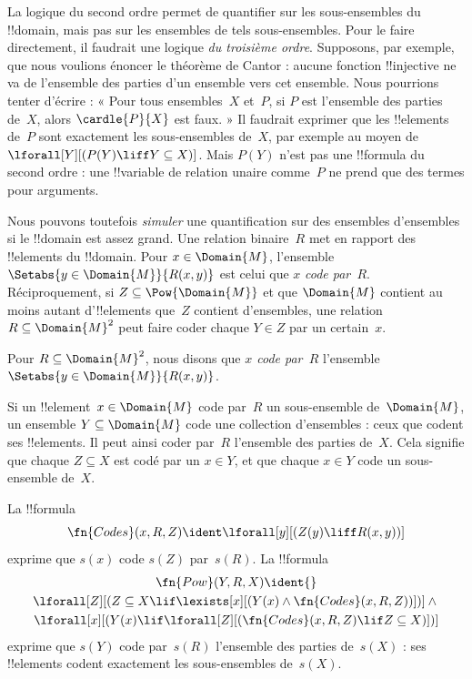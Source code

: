 \documentclass[../../../include/open-logic-section]{subfiles}
\begin{document}


\begin{explain}
La logique du second ordre permet de quantifier
sur les sous-ensembles du !!{domain}, mais pas
sur les ensembles de tels sous-ensembles. Pour
le faire directement, il faudrait une logique
\emph{du troisième ordre}. Supposons, par
exemple, que nous voulions énoncer le théorème
de Cantor : aucune fonction !!{injective} ne va
de l'ensemble des parties d'un ensemble vers
cet ensemble. Nous pourrions tenter d'écrire :
« Pour tous ensembles~$X$ et~$P$, si $P$ est
l'ensemble des parties de~$X$, alors
$\cardle{P}{X}$ est faux. » Il faudrait exprimer
que les !!{element}s de~$P$ sont exactement les
sous-ensembles de~$X$, par exemple au moyen de
$\lforall[Y][(P(Y)\liff Y\subseteq X)]$.
Mais $P(Y)$ n'est pas une !!{formula} du second
ordre : une !!{variable} de relation unaire
comme~$P$ ne prend que des termes pour arguments.

Nous pouvons toutefois \emph{simuler} une
quantification sur des ensembles d'ensembles
si le !!{domain} est assez grand. Une relation
binaire~$R$ met en rapport des !!{element}s du
!!{domain}. Pour $x\in\Domain{M}$, l'ensemble
$\Setabs{y\in\Domain{M}}{R(x,y)}$ est celui que
$x$ \emph{code par~$R$}. Réciproquement, si
$Z\subseteq\Pow{\Domain{M}}$ et que
$\Domain{M}$ contient au moins autant
d'!!{element}s que~$Z$ contient d'ensembles,
une relation $R\subseteq\Domain{M}^2$ peut
faire coder chaque $Y\in Z$ par un certain~$x$.
\end{explain}

\begin{defn}
Pour $R\subseteq\Domain{M}^2$, nous disons
que \emph{$x$ code par~$R$} l'ensemble
$\Setabs{y\in\Domain{M}}{R(x,y)}$.
\end{defn}

Si un !!{element}~$x\in\Domain{M}$ code
par~$R$ un sous-ensemble de~$\Domain{M}$,
un ensemble $Y\subseteq\Domain{M}$ code
une collection d'ensembles : ceux que codent
ses !!{element}s. Il peut ainsi coder par~$R$
l'ensemble des parties de~$X$. Cela signifie que
chaque $Z\subseteq X$ est codé par un
$x\in Y$, et que chaque $x\in Y$ code
un sous-ensemble de~$X$.

\begin{prop}
La !!{formula}
\[
\fn{Codes}(x,R,Z)\ident
\lforall[y][(Z(y)\liff R(x,y))]
\]
exprime que $s(x)$ code $s(Z)$ par~$s(R)$.
La !!{formula}
\begin{multline*}
\fn{Pow}(Y,R,X)\ident{}\\
\lforall[Z][(Z\subseteq X\lif
\lexists[x][(Y(x)\land\fn{Codes}(x,R,Z))])]\land{}\\
\lforall[x][(Y(x)\lif
\lforall[Z][(\fn{Codes}(x,R,Z)\lif Z\subseteq X)])]
\end{multline*}
exprime que $s(Y)$ code par~$s(R)$
l'ensemble des parties de~$s(X)$ : ses !!{element}s
codent exactement les sous-ensembles de~$s(X)$.
\end{prop}
\end{document}

